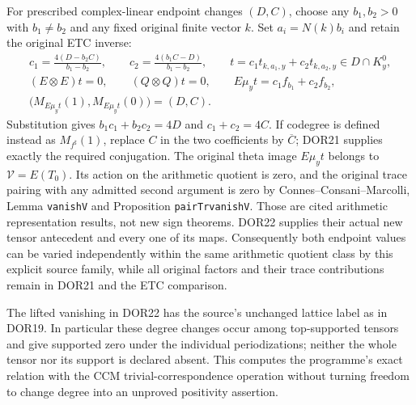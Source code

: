 For prescribed complex-linear endpoint changes $(D,C)$, choose any
$b_1,b_2>0$ with $b_1\ne b_2$ and any fixed original finite vector
$k$. Set $a_i=N(k)b_i$ and retain the original ETC inverse:
\begin{equation}\tag{DOR22}
\begin{gathered}
c_1=\frac{4(D-b_2C)}{b_1-b_2},\qquad
c_2=\frac{4(b_1C-D)}{b_1-b_2},\qquad
t=c_1t_{k,a_1,y}+c_2t_{k,a_2,y}\in D\cap K_y^0,\\
(E\otimes E)t=0,\qquad (Q\otimes Q)t=0,\qquad
E\mu_y t=c_1f_{b_1}+c_2f_{b_2},\\
\bigl(M_{E\mu_y t}(1),M_{E\mu_y t}(0)\bigr)=(D,C).
\end{gathered}
\end{equation}
Substitution gives $b_1c_1+b_2c_2=4D$ and $c_1+c_2=4C$.
If codegree is defined instead as $M_{f^\sharp}(1)$, replace $C$
in the two coefficients by $\overline C$; DOR21 supplies exactly
the required conjugation. The original theta image $E\mu_y t$
belongs to $\mathcal V=E(T_0)$. Its action on the arithmetic
quotient is zero, and the original trace pairing with any admitted
second argument is zero by Connes--Consani--Marcolli,
Lemma \texttt{vanishV} and Proposition \texttt{pairTrvanishV}.
Those are cited arithmetic representation results, not new sign
theorems. DOR22 supplies their actual new tensor antecedent and every
one of its maps. Consequently both endpoint values can be varied
independently within the same arithmetic quotient class by this
explicit source family, while all original factors and their
trace contributions remain in DOR21 and the ETC comparison.

The lifted vanishing in DOR22 has the source's unchanged lattice label
as in DOR19. In particular these degree changes occur among
top-supported tensors and give supported zero under the individual
periodizations; neither the whole tensor nor its support is declared
absent. This computes the programme's exact relation with the CCM
trivial-correspondence operation without turning freedom to change
degree into an unproved positivity assertion.
